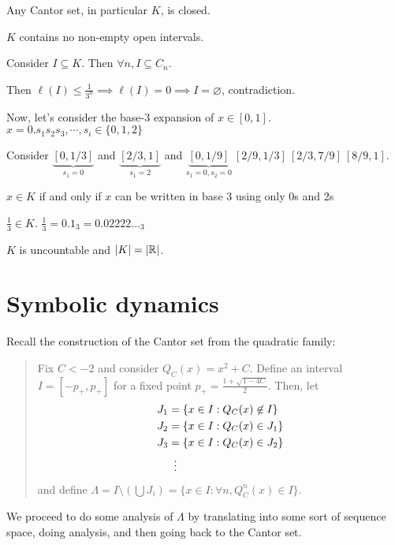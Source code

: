 \documentclass[class=pmath370,tikz,notes]{agony}
\begin{document}
\begin{theorem}
  Any Cantor set, in particular $K$, is closed.
\end{theorem}

\begin{theorem}
  $K$ contains no non-empty open intervals.
\end{theorem}
\begin{prf}
  Consider $I \subseteq K$. Then $\forall n, I \subseteq C_n$.

  Then $\ell(I) \leq \frac{1}{3^n} \implies \ell(I)=0 \implies I=\varnothing$, contradiction.
\end{prf}

Now, let's consider the base-3 expansion of $x \in [0,1]$.
$x=0.s_1s_2s_3, \cdots, s_i \in \{0, 1, 2\}$

Consider $\underbrace{[0,1/3]}_{s_1=0}$ and $\underbrace{[2/3, 1]}_{s_1=2}$ and
$\underbrace{[0, 1/9]}_{s_1=0, s_2=0} \ [2/9, 1/3] \ [2/3, 7/9] \ [8/9, 1]$.

\begin{remark}
  $x \in K$ if and only if $x$ can be written in base 3 using only 0s and 2s
\end{remark}

\begin{example}
  $\frac{1}{3} \in K$. $\frac{1}{3} = 0.1_3 = 0.02222\dots_3$
\end{example}

\begin{theorem}
  $K$ is uncountable and $\abs{K} = \abs{\mathbb{R}}$.
\end{theorem}


\chapter{Symbolic dynamics}

Recall the construction of the Cantor set from the quadratic family:
\begin{quote}
  Fix $C < -2$ and consider $Q_C(x) = x^2 + C$.
  Define an interval $I = [-p_+,p_+]$
  for a fixed point $p_+ = \frac{1+\sqrt{1-4C}}{2}$.
  Then, let
  \begin{align*}
    J_1 & = \{x \in I : Q_C(x) \not\in I\} \\
    J_2 & = \{x \in I : Q_C(x) \in J_1\}   \\
    J_3 & = \{x \in I : Q_C(x) \in J_2\}   \\
        & \vdotswithin{=}
  \end{align*}
  and define $\Lambda = I \setminus (\bigcup J_i) = \{x \in I : \forall n, Q^n_C(x) \in I\}$.
\end{quote}
We proceed to do some analysis of $\Lambda$ by translating into
some sort of sequence space, doing analysis, and then going back to the Cantor set.
\end{document}
